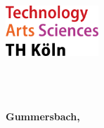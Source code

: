 
\begin{titlepage}

\vspace*{-3.5cm}

\begin{flushleft}
\hspace*{-1cm} \includegraphics[width=3.5cm]{thkoeln-logo}
\end{flushleft}

\vspace{2.5cm}

\begin{center}
	\huge{
		\textbf{\thema} \\[4.5cm]
	}
	\Large{
		\textbf{\autorTitel}} \\[1.5cm]
		\large{
		\textbf{\studiengang} \\[8cm]
	}
	\large{
		\textbf{Gummersbach, \abgabedatum} \\[2.3cm]
	}
\end{center}

\end{titlepage}
